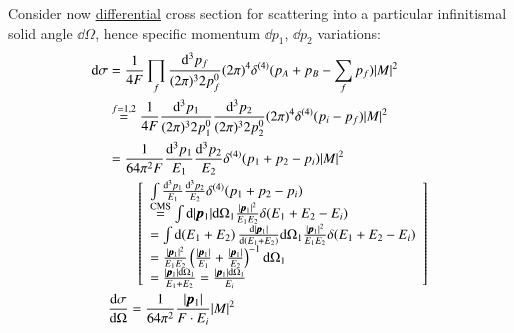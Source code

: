 Consider now \underline{differential} cross section for scattering into a particular infinitismal solid angle $\dd \Omega$, hence specific momentum $\dd p_1$, $\dd p_2$ variations:
\begin{align}
	\dd \sigma &= \frac{1}{4F}\prod_f \frac{\dd^3 p_f}{(2\pi)^3 2p_f^0} (2\pi)^4 \delta^{(4)}(p_A+p_B-\sum_f p_f)|M|^2 \notag \\
			   &\stackrel{f=1,2}{=}  \frac{1}{4F} \frac{\dd^3 p_1}{(2\pi)^3 2p_1^0} \frac{\dd^3 p_2}{(2\pi)^3 2p_2^0} (2\pi)^4 \delta^{(4)}(p_i- p_f)|M|^2 \notag\\
			   &= \frac{1}{64\pi^2 F} \frac{\dd^3 p_1}{E_1} \frac{\dd^3 p_2}{E_2} \delta^{(4)}(p_1 + p_2 - p_i) |M|^2 \notag\\
			   &\qquad \left[ 
				   \begin{array}{ll}
				   \int \frac{\dd^3 p_1}{E_1} \frac{\dd^3 p_2}{E_2} \delta^{(4)}(p_1 + p_2 - p_i)  \\ 
				   \stackrel{\text{CMS}}{=} \int \dd |\pmb{p}_1| \dd \Omega_1 \frac{|\pmb{p}_1|^2}{E_1 E_2} \delta (E_1 + E_2 -E_i) \\
				   = \int \dd (E_1 + E_2) \frac{\dd |\pmb{p}_1|}{\dd (E_1 + E_2)} \dd \Omega_1 \frac{|\pmb{p}_1|^2}{E_1 E_2} \delta (E_1 + E_2 -E_i)   \\
				   = \frac{|\pmb{p}_1|^2}{E_1 E_2} \left( \frac{|\pmb{p}_1|}{E_1} + \frac{|\pmb{p}_1|}{E_2} \right)^{-1} \dd \Omega_1 \\
				   = \frac{|\pmb{p}_1|\dd \Omega_1}{E_1 + E_2} =  \frac{|\pmb{p}_1|\dd \Omega_1}{E_i}
				   \end{array}
			   \right] \notag \\
			   &\frac{\dd \sigma}{\dd \Omega} = \frac{1}{64 \pi^2} \frac{|\pmb{p}_1|}{F\cdot E_i} |M|^2	
\end{align}

